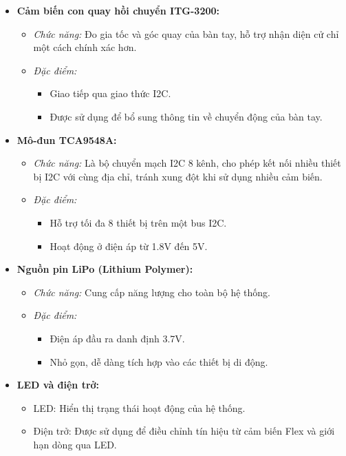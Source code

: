 \begin{itemize}
    \item \textbf{Cảm biến con quay hồi chuyển ITG-3200:}
    \begin{itemize}
        \item \textit{Chức năng:} Đo gia tốc và góc quay của bàn tay, hỗ trợ nhận diện cử chỉ một cách chính xác hơn.
        \item \textit{Đặc điểm:}
        \begin{itemize}
            \item Giao tiếp qua giao thức I2C.
            \item Được sử dụng để bổ sung thông tin về chuyển động của bàn tay.
        \end{itemize}
    \end{itemize}

    \item \textbf{Mô-đun TCA9548A:}
    \begin{itemize}
        \item \textit{Chức năng:} Là bộ chuyển mạch I2C 8 kênh, cho phép kết nối nhiều thiết bị I2C với cùng địa chỉ, tránh xung đột khi sử dụng nhiều cảm biến.
        \item \textit{Đặc điểm:}
        \begin{itemize}
            \item Hỗ trợ tối đa 8 thiết bị trên một bus I2C.
            \item Hoạt động ở điện áp từ 1.8V đến 5V.
        \end{itemize}
    \end{itemize}

    \item \textbf{Nguồn pin LiPo (Lithium Polymer):}
    \begin{itemize}
        \item \textit{Chức năng:} Cung cấp năng lượng cho toàn bộ hệ thống.
        \item \textit{Đặc điểm:}
        \begin{itemize}
            \item Điện áp đầu ra danh định 3.7V.
            \item Nhỏ gọn, dễ dàng tích hợp vào các thiết bị di động.
        \end{itemize}
    \end{itemize}

    \item \textbf{LED và điện trở:}
    \begin{itemize}
        \item LED: Hiển thị trạng thái hoạt động của hệ thống.
        \item Điện trở: Được sử dụng để điều chỉnh tín hiệu từ cảm biến Flex và giới hạn dòng qua LED.
    \end{itemize}
\end{itemize}

